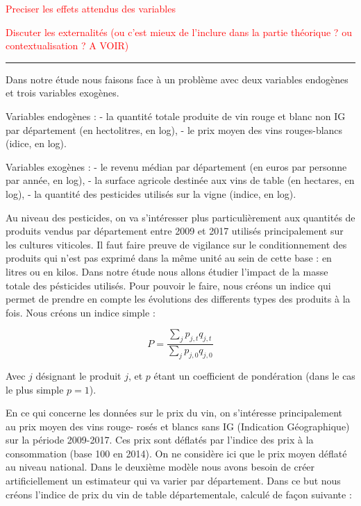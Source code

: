 \documentclass[11pt,]{article}
\begin{document}
\textcolor{red}{Preciser les effets attendus des variables}

\textcolor{red}{Discuter les externalités (ou c'est mieux de l'inclure dans la partie théorique ? ou contextualisation ? A VOIR)}

\noindent

\rule[0.5ex]{\linewidth}{1pt}

Dans notre étude nous faisons face à un problème avec deux variables
endogènes et trois variables exogènes.

Variables endogènes : - la quantité totale produite de vin rouge et
blanc non IG par département (en hectolitres, en log), - le prix moyen
des vins rouges-blancs (idice, en log).

Variables exogènes : - le revenu médian par département (en euros par
personne par année, en log), - la surface agricole destinée aux vins de
table (en hectares, en log), - la quantité des pesticides utilisés sur
la vigne (indice, en log).

Au niveau des pesticides, on va s'intéresser plus particulièrement aux
quantités de produits vendus par département entre 2009 et 2017 utilisés
principalement sur les cultures viticoles. Il faut faire preuve de
vigilance sur le conditionnement des produits qui n'est pas exprimé dans
la même unité au sein de cette base : en litres ou en kilos. Dans notre
étude nous allons étudier l'impact de la masse totale des pésticides
utilisés. Pour pouvoir le faire, nous créons un indice qui permet de
prendre en compte les évolutions des differents types des produits à la
fois. Nous créons un indice simple :

\begin{equation*}
  P = \frac{\sum_j p_{j, t} q_{j, t}}{\sum_j p_{j, 0} q_{j, 0}}
\end{equation*}

Avec \(j\) désignant le produit \(j\), et \(p\) étant un coefficient de
pondération (dans le cas le plus simple \(p = 1\)).

En ce qui concerne les données sur le prix du vin, on s'intéresse
principalement au prix moyen des vins rouge- rosés et blancs sans IG
(Indication Géographique) sur la période 2009-2017. Ces prix sont
déflatés par l'indice des prix à la consommation (base 100 en 2014). On
ne considère ici que le prix moyen déflaté au niveau national. Dans le
deuxième modèle nous avons besoin de créer artificiellement un
estimateur qui va varier par département. Dans ce but nous créons
l'indice de prix du vin de table départementale, calculé de façon
suivante :
\end{document}
